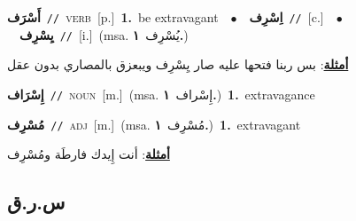 \documentclass[10pt,a4paper,twoside]{article} %
\begin{document}
\begin{multicols}{2}
{\setlength\topsep{0pt}\textbf{\foreignlanguage{arabic}{أَسْرَف}}\ {\color{gray}\texttt{//}\color{black}}\ \textsc{verb}\ [p.]\ \textbf{1.}~be extravagant\ \ $\bullet$\ \ \setlength\topsep{0pt}\textbf{\foreignlanguage{arabic}{اِسْرِف}}\ {\color{gray}\texttt{//}\color{black}}\ [c.]\ \ $\bullet$\ \ \setlength\topsep{0pt}\textbf{\foreignlanguage{arabic}{يِسْرِف}}\ {\color{gray}\texttt{//}\color{black}}\ [i.]\ \color{gray}(msa. \foreignlanguage{arabic}{يُسْرِف}~\foreignlanguage{arabic}{\textbf{١.}})\color{black}\  \begin{flushright}\color{gray}\foreignlanguage{arabic}{\textbf{\underline{\foreignlanguage{arabic}{أمثلة}}}: بس ربنا فتحها عليه صار يِسْرِف ويبعزق بالمصاري بدون عقل}\end{flushright}\color{black}} \vspace{2mm}

{\setlength\topsep{0pt}\textbf{\foreignlanguage{arabic}{إِسْرَاف}}\ {\color{gray}\texttt{//}\color{black}}\ \textsc{noun}\ [m.]\ \color{gray}(msa. \foreignlanguage{arabic}{إِسْراف}~\foreignlanguage{arabic}{\textbf{١.}})\color{black}\ \textbf{1.}~extravagance\ } \vspace{2mm}

{\setlength\topsep{0pt}\textbf{\foreignlanguage{arabic}{مُسْرِف}}\ {\color{gray}\texttt{//}\color{black}}\ \textsc{adj}\ [m.]\ \color{gray}(msa. \foreignlanguage{arabic}{مُسْرِف}~\foreignlanguage{arabic}{\textbf{١.}})\color{black}\ \textbf{1.}~extravagant\  \begin{flushright}\color{gray}\foreignlanguage{arabic}{\textbf{\underline{\foreignlanguage{arabic}{أمثلة}}}: أنت إِيدك فارطَة ومُسْرِف}\end{flushright}\color{black}} \vspace{2mm}

\vspace{-3mm}
\subsection*{\color{blue}\foreignlanguage{arabic}{س.ر.ق}\color{blue}{}} 


\end{multicols}
\end{document}
